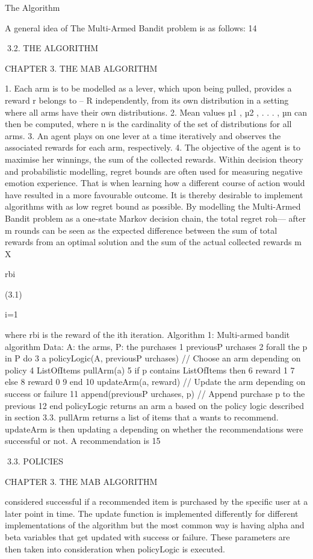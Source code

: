 The Algorithm

A general idea of The Multi-Armed Bandit problem is as follows:
14

3.2. THE ALGORITHM

CHAPTER 3. THE MAB ALGORITHM

1. Each arm is to be modelled as a lever, which upon being pulled, provides a reward
r belongs to -- R independently, from its own distribution in a setting where all arms have
their own distributions.
2. Mean values µ1 , µ2 , . . . , µn can then be computed, where n is the cardinality of the
set of distributions for all arms.
3. An agent plays on one lever at a time iteratively and observes the associated
rewards for each arm, respectively.
4. The objective of the agent is to maximise her winnings, the sum of the collected
rewards.
Within decision theory and probabilistic modelling, regret bounds are often used for
measuring negative emotion experience. That is when learning how a different course
of action would have resulted in a more favourable outcome. It is thereby desirable to
implement algorithms with as low regret bound as possible.
By modelling the Multi-Armed Bandit problem as a one-state Markov decision chain,
the total regret roh--- after m rounds can be seen as the expected difference between the sum
of total rewards from an optimal solution and the sum of the actual collected rewards
m
X

rbi

(3.1)

i=1

where rbi is the reward of the ith iteration.
Algorithm 1: Multi-armed bandit algorithm
Data: A: the arms, P: the purchases
1 previousP urchases  {}
2 forall the p in P do
3
a  policyLogic(A, previousP urchases) // Choose an arm depending on
policy
4
ListOfItems pullArm(a)
5
if p contains ListOfItems then
6
reward 1
7
else
8
reward 0
9
end
10
updateArm(a, reward) // Update the arm depending on success or failure
11
append(previousP urchases, p) // Append purchase p to the previous
12 end
policyLogic returns an arm a based on the policy logic described in section 3.3. pullArm
returns a list of items that a wants to recommend. updateArm is then updating a depending on whether the recommendations were successful or not. A recommendation is
15

3.3. POLICIES

CHAPTER 3. THE MAB ALGORITHM

considered successful if a recommended item is purchased by the specific user at a later
point in time. The update function is implemented differently for different implementations of the algorithm but the most common way is having alpha and beta variables that
get updated with success or failure. These parameters are then taken into consideration
when policyLogic is executed.

